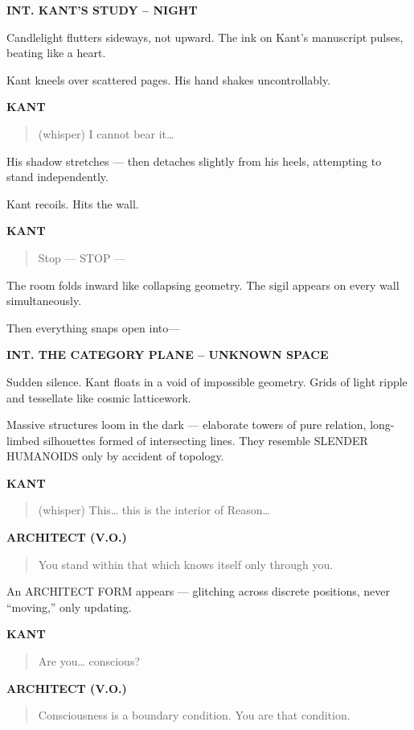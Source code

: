 \documentclass[12pt]{article}
\newcommand{\Scene}[1]{\vspace{1.2em}\textbf{#1}\vspace{0.8em}}
\newcommand{\Character}[1]{\vspace{0.8em}\textbf{#1}\vspace{0.4em}}
\newenvironment{Dialogue}{\begin{quote}\begin{RaggedRight}}{\end{RaggedRight}\end{quote}}
\newcommand{\Action}[1]{\vspace{0.4em}#1\vspace{0.4em}}
\begin{document}
\Scene{INT. KANT’S STUDY – NIGHT}

\Action{Candlelight flutters sideways, not upward.  
The ink on Kant’s manuscript pulses, beating like a heart.}

\Action{Kant kneels over scattered pages.  
His hand shakes uncontrollably.}

\Character{KANT}
\begin{Dialogue}
(whisper)  
I cannot bear it…
\end{Dialogue}

\Action{His shadow stretches — then detaches slightly from his heels,  
attempting to stand independently.}

\Action{Kant recoils. Hits the wall.}

\Character{KANT}
\begin{Dialogue}
Stop — STOP —
\end{Dialogue}

\Action{The room folds inward like collapsing geometry.  
The sigil appears on every wall simultaneously.}

\Action{Then everything snaps open into—}

\Scene{INT. THE CATEGORY PLANE – UNKNOWN SPACE}

\Action{Sudden silence.  
Kant floats in a void of impossible geometry.  
Grids of light ripple and tessellate like cosmic latticework.}

\Action{Massive structures loom in the dark —  
elaborate towers of pure relation,  
long-limbed silhouettes formed of intersecting lines.  
They resemble SLENDER HUMANOIDS  
only by accident of topology.}

\Character{KANT}
\begin{Dialogue}
(whisper)  
This… this is the interior of Reason…
\end{Dialogue}

\Character{ARCHITECT (V.O.)}
\begin{Dialogue}
You stand within that which knows itself  
only through you.
\end{Dialogue}

\Action{An ARCHITECT FORM appears —  
glitching across discrete positions,  
never “moving,” only updating.}

\Character{KANT}
\begin{Dialogue}
Are you… conscious?
\end{Dialogue}

\Character{ARCHITECT (V.O.)}
\begin{Dialogue}
Consciousness is a boundary condition.  
You are that condition.
\end{Dialogue}
\end{document}
